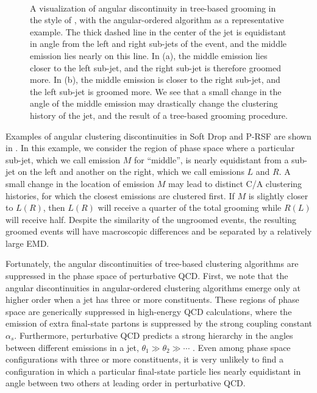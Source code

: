\documentclass[letterpaper,11pt]{article}
\begin{document}
\begin{figure}[t!]
      \centering
      ~~~~
\caption{
    A visualization of angular discontinuity in tree-based grooming in the style of , with the angular-ordered  algorithm as a representative example.
    The thick dashed line in the center of the jet is equidistant in angle from the left and right sub-jets of the event, and the middle emission lies nearly on this line.
    In (a), the middle emission lies closer to the left sub-jet, and the right sub-jet is therefore groomed more.
    In (b), the middle emission is closer to the right sub-jet, and the left sub-jet is groomed more.
    We see that a small change in the angle of the middle emission may drastically change the clustering history of the jet, and the result of a tree-based grooming procedure.
}
\label{fig:angdiscont}
\end{figure}


Examples of angular clustering discontinuities in Soft Drop and P-RSF are shown in .
%
In this example, we consider the region of phase space where a particular sub-jet, which we call emission \(M\) for ``middle'', is nearly equidistant from a sub-jet on the left and another on the right, which we call emissions \(L\) and \(R\).
%
A small change in the location of emission \(M\) may lead to distinct C/A clustering histories, for which the closest emissions are clustered first.
%
If \(M\) is slightly closer to \(L (R)\), then \(L (R)\) will receive a quarter of the total grooming while \(R (L)\) will receive half.
%
Despite the similarity of the ungroomed events, the resulting groomed events will have macroscopic differences and be separated by a relatively large EMD.

Fortunately, the angular discontinuities of tree-based clustering algorithms are suppressed in the phase space of perturbative QCD.
%
First, we note that the angular discontinuities in angular-ordered clustering algorithms emerge only at higher order when a jet has three or more constituents.
%
These regions of phase space are generically suppressed in high-energy QCD calculations, where the emission of extra final-state partons is suppressed by the strong coupling constant \(\alpha_s\).
%
Furthermore, perturbative QCD predicts a strong hierarchy in the angles between different emissions in a jet, \(\theta_1 \gg \theta_2 \gg \cdots\) \cite{Collins:2011zzd}.
%
Even among phase space configurations with three or more constituents, it is very unlikely to find a configuration in which a particular final-state particle lies nearly equidistant in angle between two others at leading order in perturbative QCD.
\end{document}
